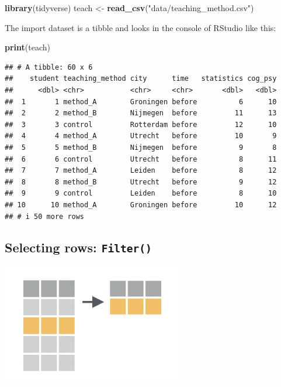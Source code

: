\documentclass[
]{scrartcl}
\newenvironment{Shaded}{\begin{snugshade}}{\end{snugshade}}
\newcommand{\FunctionTok}[1]{\textcolor[rgb]{0.13,0.29,0.53}{\textbf{#1}}}
\newcommand{\NormalTok}[1]{#1}
\newcommand{\OtherTok}[1]{\textcolor[rgb]{0.56,0.35,0.01}{#1}}
\newcommand{\StringTok}[1]{\textcolor[rgb]{0.31,0.60,0.02}{#1}}
\begin{document}
\begin{Shaded}
\begin{Highlighting}[]
\FunctionTok{library}\NormalTok{(tidyverse)}
\NormalTok{teach }\OtherTok{\textless{}{-}} \FunctionTok{read\_csv}\NormalTok{(}\StringTok{"data/teaching\_method.csv"}\NormalTok{)}
\end{Highlighting}
\end{Shaded}

The import dataset is a tibble and looks in the console of RStudio like this:

\begin{Shaded}
\begin{Highlighting}[]
\FunctionTok{print}\NormalTok{(teach)}
\end{Highlighting}
\end{Shaded}

\begin{verbatim}
## # A tibble: 60 x 6
##    student teaching_method city      time   statistics cog_psy
##      <dbl> <chr>           <chr>     <chr>       <dbl>   <dbl>
##  1       1 method_A        Groningen before          6      10
##  2       2 method_B        Nijmegen  before         11      13
##  3       3 control         Rotterdam before         12      10
##  4       4 method_A        Utrecht   before         10       9
##  5       5 method_B        Nijmegen  before          9       8
##  6       6 control         Utrecht   before          8      11
##  7       7 method_A        Leiden    before          8      12
##  8       8 method_B        Utrecht   before          9      12
##  9       9 control         Leiden    before          8      10
## 10      10 method_A        Groningen before         10      12
## # i 50 more rows
\end{verbatim}

\hypertarget{selecting-rows-filter}{%
\subsection{\texorpdfstring{Selecting rows: \texttt{Filter()}}{Selecting rows: Filter()}}\label{selecting-rows-filter}}

\begin{center}\includegraphics[width=300px]{images/dplyr-filter} \end{center}
\end{document}
